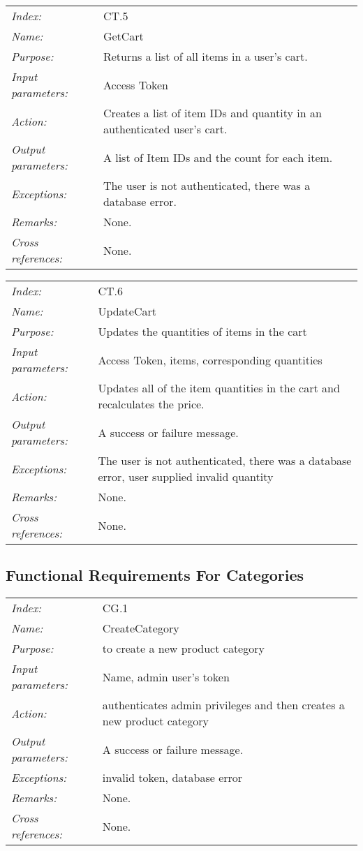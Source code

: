\documentclass[10pt,letter]{article}
\begin{document}
\begin{tabularx}{\textwidth}{l X}
    \it{Index:} & CT.5 \\
    \it{Name:} & GetCart \\
    \it{Purpose:} & Returns a list of all items in a user's cart. \\
    \it{Input parameters:} & Access Token \\
    \it{Action:} & Creates a list of item IDs and quantity in an authenticated user's cart. \\
    \it{Output parameters:} & A list of Item IDs and the count for each item. \\
    \it{Exceptions:} & The user is not authenticated, there was a database error. \\
    \it{Remarks:} & None. \\
    \it{Cross references:} & None. \\
    \hline
\end{tabularx}

\begin{tabularx}{\textwidth}{l X}
    \it{Index:} & CT.6 \\
    \it{Name:} & UpdateCart \\
    \it{Purpose:} & Updates the quantities of items in the cart\\
    \it{Input parameters:} & Access Token, items, corresponding quantities \\
    \it{Action:} & Updates all of the item quantities in the cart and recalculates the price. \\
    \it{Output parameters:} & A success or failure message. \\
    \it{Exceptions:} & The user is not authenticated, there was a database error, user supplied invalid quantity \\
    \it{Remarks:} & None. \\
    \it{Cross references:} & None. \\
    \hline
\end{tabularx}

\subsection{Functional Requirements For Categories}

\begin{tabularx}{\textwidth}{l X}
    \it{Index:} & CG.1 \\
    \it{Name:} &  CreateCategory\\
    \it{Purpose:} & to create a new product category\\
    \it{Input parameters:} &  Name, admin user's token\\
    \it{Action:} &  authenticates admin privileges and then creates a new product category \\
    \it{Output parameters:} & A success or failure message. \\
    \it{Exceptions:} & invalid token, database error\\
    \it{Remarks:} & None. \\
    \it{Cross references:} & None. \\
    \hline
\end{tabularx}
\end{document}

